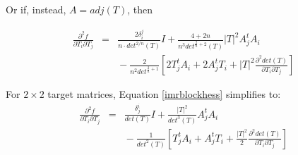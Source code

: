 \documentclass{report}
\begin{document}
Or if, instead, $A = adj(T)$, then

\begin{eqnarray} \label{imrblockhess}
\frac{\partial^2 f}{\partial T_i \partial T_j} 
&=& \frac{2 \delta_i^j}{n \cdot det^{2/n}(T)} I
+ \frac{4 + 2n}{n^3 det^{\frac{2}{n}+2}(T)} |T|^2 A_j^t A_i \\ \nonumber
& & {} - \frac{2}{n^2 det^{\frac{2}{n}+1}} \left[ 
2 T_j^t A_i + 2 A_j^t T_i + |T|^2 \frac{\partial^2 det(T)}{\partial T_i \partial T_j} \right]
\end{eqnarray}



For $2 \times 2$ target matrices, Equation \ref{imrblockhess} simplifies to:
\begin{eqnarray}
\frac{\partial^2 f}{\partial T_i \partial T_j}
&=& \frac{\delta^i_j}{det(T)}I + \frac{|T|^2}{det^3(T)} A_j^t A_i \\ \nonumber
& & {} - \frac{1}{det^2(T)} \left[ T_j^t A_i + A_j^t T_i 
+ \frac{|T|^2}{2} \frac{\partial^2 det(T)}{\partial T_i \partial T_j} \right]
\end{eqnarray}
\end{document}
